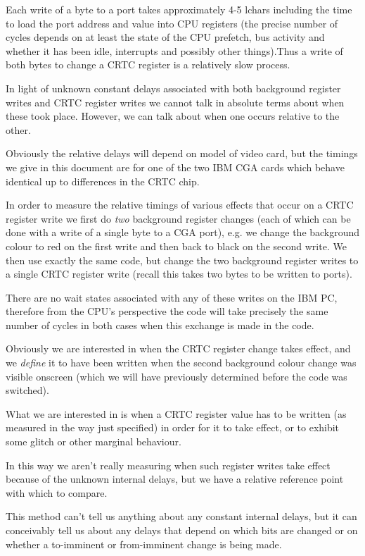 \documentclass[a4paper,10pt]{amsart}
\begin{document}
Each write of a byte to a port takes approximately 4-5 lchars including the time
to load the port address and value into CPU registers (the precise number of
cycles depends on at least the state of the CPU prefetch, bus activity and
whether it has been idle, interrupts and possibly other things).Thus a write of
both bytes to change a CRTC register is a relatively slow process.

In light of unknown constant delays associated with both background register
writes and CRTC register writes we cannot talk in absolute terms about when
these took place. However, we can talk about when one occurs relative to the
other.

Obviously the relative delays will depend on model of video card, but the
timings we give in this document are for one of the two IBM CGA cards which
behave identical up to differences in the CRTC chip.

In order to measure the relative timings of various effects that occur on a
CRTC register write we first do \emph{two} background register changes (each of
which can be done with a write of a single byte to a CGA port), e.g. we change
the background colour to red on the first write and then back to black on the
second write. We then use exactly the same code, but change the two background
register writes to a single CRTC register write (recall this takes two bytes to
be written to ports).

There are no wait states associated with any of these writes on the IBM PC,
therefore from the CPU's perspective the code will take precisely the same
number of cycles in both cases when this exchange is made in the code.

Obviously we are interested in when the CRTC register change takes effect,
and we \emph{define} it to have been written when the second background colour
change was visible onscreen (which we will have previously determined before
the code was switched).

What we are interested in is when a CRTC register value has to be written (as
measured in the way just specified) in order for it to take effect, or to
exhibit some glitch or other marginal behaviour.

In this way we aren't really measuring when such register writes take effect
because of the unknown internal delays, but we have a relative reference point
with which to compare.

This method can't tell us anything about any constant internal delays, but it
can conceivably tell us about any delays that depend on which bits are changed
or on whether a to-imminent or from-imminent change is being made.
\end{document}
